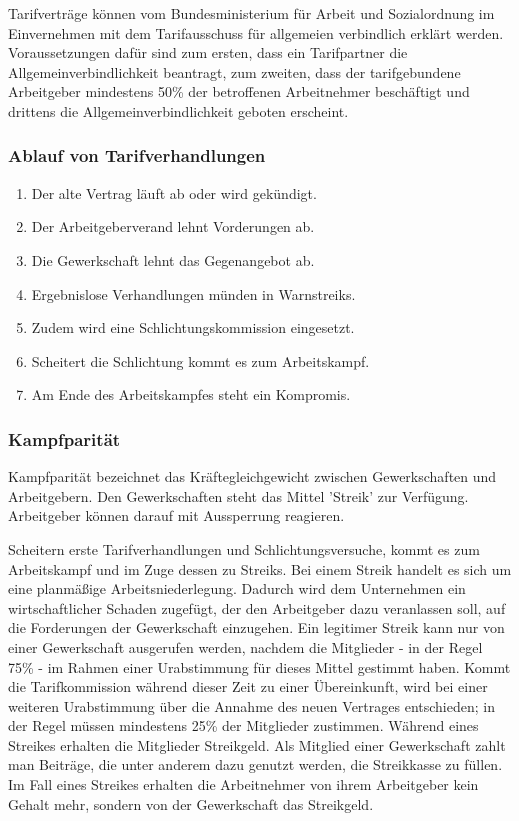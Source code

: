 Tarifverträge können vom Bundesministerium für Arbeit und Sozialordnung im Einvernehmen mit dem Tarifausschuss für allgemeien verbindlich erklärt werden. Voraussetzungen dafür sind zum ersten, dass ein Tarifpartner die Allgemeinverbindlichkeit beantragt, zum zweiten, dass der tarifgebundene Arbeitgeber mindestens 50\% der betroffenen Arbeitnehmer beschäftigt und drittens die Allgemeinverbindlichkeit geboten erscheint. 

\subsubsection{Ablauf von Tarifverhandlungen}

\begin{enumerate}
	\item Der alte Vertrag läuft ab oder wird gekündigt.
	\item Der Arbeitgeberverand lehnt Vorderungen ab.
	\item Die Gewerkschaft lehnt das Gegenangebot ab.
	\item Ergebnislose Verhandlungen münden in Warnstreiks.
	\item Zudem wird eine Schlichtungskommission eingesetzt.
	\item Scheitert die Schlichtung kommt es zum Arbeitskampf.
	\item Am Ende des Arbeitskampfes steht ein Kompromis.
\end{enumerate}

\subsubsection{Kampfparität}

Kampfparität bezeichnet das Kräftegleichgewicht zwischen Gewerkschaften und Arbeitgebern. Den Gewerkschaften steht das Mittel 'Streik' zur Verfügung. Arbeitgeber können darauf mit Aussperrung reagieren.

Scheitern erste Tarifverhandlungen und Schlichtungsversuche, kommt es zum  Arbeitskampf und im Zuge dessen zu Streiks. Bei einem Streik handelt es sich um eine planmäßige Arbeitsniederlegung. Dadurch wird dem Unternehmen ein wirtschaftlicher Schaden zugefügt, der den Arbeitgeber dazu veranlassen soll, auf die Forderungen der Gewerkschaft einzugehen. Ein legitimer Streik kann nur von einer Gewerkschaft ausgerufen werden, nachdem die Mitglieder - in der Regel 75\% - im Rahmen einer Urabstimmung für dieses Mittel gestimmt haben. Kommt die Tarifkommission während dieser Zeit zu einer Übereinkunft, wird bei einer weiteren Urabstimmung über die Annahme des neuen Vertrages entschieden; in der Regel müssen mindestens 25\% der Mitglieder zustimmen. Während eines Streikes erhalten die Mitglieder Streikgeld. Als Mitglied einer Gewerkschaft zahlt man Beiträge, die unter anderem dazu genutzt werden, die Streikkasse zu füllen. Im Fall eines Streikes erhalten die Arbeitnehmer von ihrem Arbeitgeber kein Gehalt mehr, sondern von der Gewerkschaft das Streikgeld.

